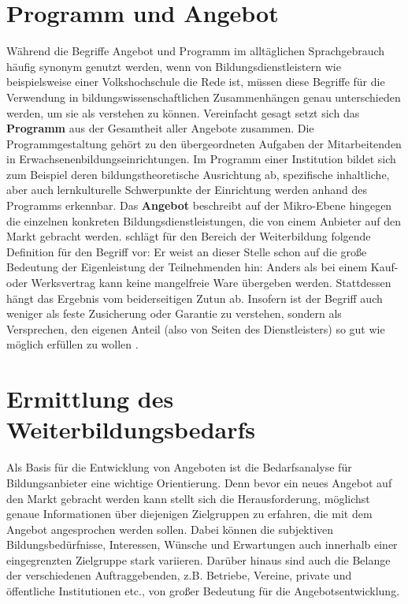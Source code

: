 \documentclass[
  twoside,
  parskip=half-,
]{scrreprt}
\begin{document}
\section{Programm und Angebot} Während die Begriffe Angebot und Programm im alltäglichen Sprachgebrauch häufig synonym genutzt werden, wenn von Bildungsdienstleistern wie beispielsweise einer Volkshochschule die Rede ist, müssen diese Begriffe für die Verwendung in bildungswissenschaftlichen Zusammenhängen genau unterschieden werden, um sie als  verstehen zu können. Vereinfacht gesagt setzt sich das \textbf{Programm} aus der Gesamtheit aller Angebote zusammen. Die Programmgestaltung gehört zu den übergeordneten Aufgaben der Mitarbeitenden in Erwachsenenbildungseinrichtungen. Im Programm einer Institution bildet sich zum Beispiel deren bildungstheoretische Ausrichtung ab, spezifische inhaltliche, aber auch lernkulturelle Schwerpunkte der Einrichtung werden anhand des Programms erkennbar. Das \textbf{Angebot} beschreibt auf der Mikro-Ebene hingegen die einzelnen konkreten Bildungsdienstleistungen, die von einem Anbieter auf den Markt gebracht werden. \citeauthor{schlutz} schlägt für den Bereich der Weiterbildung folgende Definition für den Begriff  vor:
 Er weist an dieser Stelle schon auf die große Bedeutung der Eigenleistung der Teilnehmenden hin: Anders als bei einem Kauf- oder Werksvertrag kann keine mangelfreie Ware übergeben werden. Stattdessen hängt das Ergebnis vom beiderseitigen Zutun ab. Insofern ist der Begriff  auch weniger als feste Zusicherung oder Garantie zu verstehen, sondern als Versprechen, den eigenen Anteil (also von Seiten des Dienstleisters) so gut wie möglich erfüllen zu wollen \autocite[vgl. auch][129]{fleige}.

\section{Ermittlung des Weiterbildungsbedarfs}

Als Basis für die Entwicklung von Angeboten ist die Bedarfsanalyse für Bildungsanbieter eine wichtige Orientierung. Denn bevor ein neues Angebot auf den Markt gebracht werden kann stellt sich die Herausforderung, möglichst genaue Informationen über diejenigen Zielgruppen zu erfahren, die mit dem Angebot angesprochen werden sollen. Dabei können die subjektiven Bildungsbedürfnisse, Interessen, Wünsche und Erwartungen auch innerhalb einer eingegrenzten Zielgruppe stark variieren. Darüber hinaus sind auch die Belange der verschiedenen Auftraggebenden, z.B. Betriebe, Vereine, private und öffentliche Institutionen etc., von großer Bedeutung für die Angebotsentwicklung.
\end{document}

